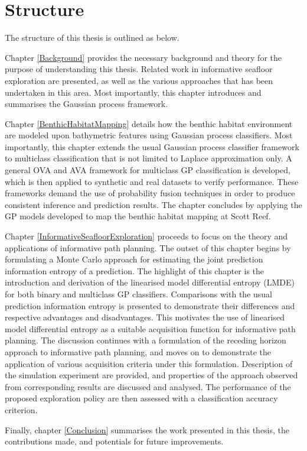 	\section{Structure}
	
		The structure of this thesis is outlined as below.
		
		
		Chapter \ref{Background} provides the necessary background and theory for the purpose of understanding this thesis. Related work in informative seafloor exploration are presented, as well as the various approaches that has been undertaken in this area. Most importantly, this chapter introduces and summarises the Gaussian process framework.
		
		Chapter \ref{BenthicHabitatMapping} details how the benthic habitat environment are modeled upon bathymetric features using Gaussian process classifiers. Most importantly, this chapter extends the usual Gaussian process classifier framework to multiclass classification that is not limited to Laplace approximation only. A general OVA and AVA framework for multiclass GP classification is developed, which is then applied to synthetic and real datasets to verify performance. These frameworks demand the use of probability fusion techniques in order to produce consistent inference and prediction results. The chapter concludes by applying the GP models developed to map the benthic habitat mapping at Scott Reef.
		
		Chapter \ref{InformativeSeafloorExploration} proceeds to focus on the theory and applications of informative path planning. The outset of this chapter begins by formulating a Monte Carlo approach for estimating the joint prediction information entropy of a prediction. The highlight of this chapter is the introduction and derivation of the linearised model differential entropy (LMDE) for both binary and multiclass GP classifiers. Comparisons with the usual prediction information entropy is presented to demonstrate their differences and respective advantages and disadvantages. This motivates the use of linearised model differential entropy as a suitable acquisition function for informative path planning. The discussion continues with a formulation of the receding horizon approach to informative path planning, and moves on to demonstrate the application of various acquisition criteria under this formulation. Description of the simulation experiment are provided, and properties of the approach observed from corresponding results are discussed and analysed. The performance of the proposed exploration policy are then assessed with a classification accuracy criterion.
		
		Finally, chapter \ref{Conclusion} summarises the work presented in this thesis, the contributions made, and potentials for future improvements.